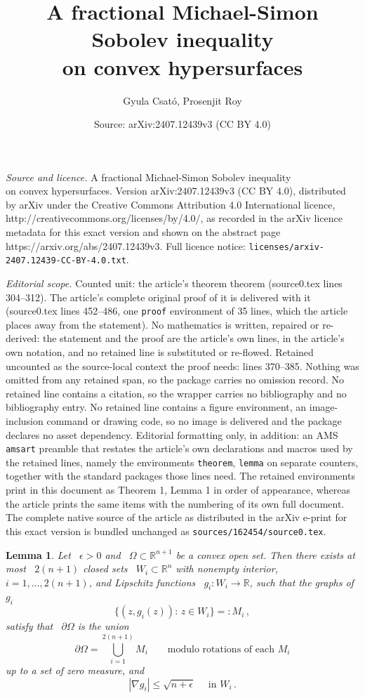 \documentclass[10pt,a4paper]{amsart}
\title{A fractional Michael-Simon Sobolev inequality\\ on convex hypersurfaces}
\author{Gyula Csat\'o, Prosenjit Roy}
\date{Source: arXiv:2407.12439v3 (CC BY 4.0)}
\newtheorem{lemma}{Lemma}
\newcommand{\R}{\mathbb{R}}
\renewcommand{\leq}{\leqslant}
\begin{document}
\maketitle

\noindent\emph{Source and licence.} A fractional Michael-Simon Sobolev inequality\\ on convex hypersurfaces. Version arXiv:2407.12439v3 (CC BY 4.0), distributed by arXiv under the Creative Commons Attribution 4.0 International licence, http://creativecommons.org/licenses/by/4.0/, as recorded in the arXiv licence metadata for this exact version and shown on the abstract page https://arxiv.org/abs/2407.12439v3. Full licence notice: \texttt{licenses/arxiv-2407.12439-CC-BY-4.0.txt}.\par\smallskip

\noindent\textit{Editorial scope.} Counted unit: the article's theorem theorem (source0.tex lines 304--312). The article's complete original proof of it is delivered with it (source0.tex lines 452--486, one \texttt{proof} environment of 35 lines, which the article places away from the statement). No mathematics is written, repaired or re-derived: the statement and the proof are the article's own lines, in the article's own notation, and no retained line is substituted or re-flowed.  Retained uncounted as the source-local context the proof needs: lines 370--385.  Nothing was omitted from any retained span, so the package carries no omission record.  No retained line contains a citation, so the wrapper carries no bibliography and no bibliography entry.  No retained line contains a figure environment, an image-inclusion command or drawing code, so no image is delivered and the package declares no asset dependency.  Editorial formatting only, in addition: an AMS \texttt{amsart} preamble that restates the article's own declarations and macros used by the retained lines, namely the environments \texttt{theorem}, \texttt{lemma} on separate counters, together with the standard packages those lines need.  The retained environments print in this document as Theorem 1, Lemma 1 in order of appearance, whereas the article prints the same items with the numbering of its own full document.  The complete native source of the article as distributed in the arXiv e-print for this exact version is bundled unchanged as \texttt{sources/162454/source0.tex}.
\begin{lemma}
 \label{gy:lemma:split into Mi}
  Let ~$\epsilon>0$ and ~$\Omega\subset\R^{n+1}$ be a convex open set. Then there exists  at most ~$2(n+1)$ closed sets ~$W_i\subset\R^n$ with nonempty interior, ~$i=1,\ldots,2(n+1)$, and Lipschitz functions ~$g_i:W_i\to \R$, such that the graphs of $g_i$
  $$
    \{(z,g_i(z)):\, z\in W_i\}=:M_i\,,
  $$
  satisfy that ~$\partial\Omega$ is the union 
  $$
    \partial\Omega=\bigcup_{i=1}^{2(n+1)}M_i\qquad\text{modulo rotations of each $M_i$} 
  $$
  up to a set of zero measure,
  and
  $$
    |\nabla g_i|\leq \sqrt{n+\epsilon}\quad\text{ in }W_i\,.
$$
\end{lemma}
\end{document}
